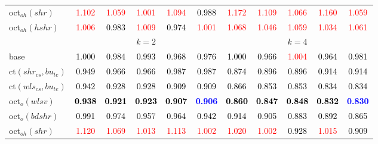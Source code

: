 \begin{tabular}[t]{l|>{}cccc>{}c|ccccc}
oct$_{oh}(shr)$ & \textcolor{red}{1.102} & \textcolor{red}{1.059} & \textcolor{red}{1.001} & \textcolor{red}{1.094} & \textcolor{black}{0.988} & \textcolor{red}{1.172} & \textcolor{red}{1.109} & \textcolor{red}{1.066} & \textcolor{red}{1.160} & \textcolor{red}{1.059}\\
oct$_{oh}(hshr)$ & \textcolor{red}{1.006} & \textcolor{black}{0.983} & \textcolor{red}{1.009} & \textcolor{black}{0.974} & \textcolor{red}{1.001} & \textcolor{red}{1.068} & \textcolor{red}{1.046} & \textcolor{red}{1.059} & \textcolor{red}{1.034} & \textcolor{red}{1.061}\\
\addlinespace[0.3em]
\multicolumn{1}{c}{} & \multicolumn{5}{c}{\textbf{$k = 2$}} & \multicolumn{5}{c}{\textbf{$k = 4$}}\\
base & \textcolor{black}{1.000} & \textcolor{black}{0.984} & \textcolor{black}{0.993} & \textcolor{black}{0.968} & \textcolor{black}{0.976} & \textcolor{black}{1.000} & \textcolor{black}{0.966} & \textcolor{red}{1.004} & \textcolor{black}{0.964} & \textcolor{black}{0.981}\\
ct$(shr_{cs}, bu_{te})$ & \textcolor{black}{0.949} & \textcolor{black}{0.966} & \textcolor{black}{0.966} & \textcolor{black}{0.987} & \textcolor{black}{0.987} & \textcolor{black}{0.874} & \textcolor{black}{0.896} & \textcolor{black}{0.896} & \textcolor{black}{0.914} & \textcolor{black}{0.914}\\
ct$(wls_{cs}, bu_{te})$ & \textcolor{black}{0.942} & \textcolor{black}{0.928} & \textcolor{black}{0.928} & \textcolor{black}{0.909} & \textcolor{black}{0.909} & \textcolor{black}{0.866} & \textcolor{black}{0.853} & \textcolor{black}{0.853} & \textcolor{black}{0.834} & \textcolor{black}{0.834}\\
oct$_o(wlsv)$ & \textcolor{black}{\textbf{0.938}} & \textcolor{black}{\textbf{0.921}} & \textcolor{black}{\textbf{0.923}} & \textcolor{black}{\textbf{0.907}} & \textcolor{blue}{\textbf{0.906}} & \textcolor{black}{\textbf{0.860}} & \textcolor{black}{\textbf{0.847}} & \textcolor{black}{\textbf{0.848}} & \textcolor{black}{\textbf{0.832}} & \textcolor{blue}{\textbf{0.830}}\\
oct$_o(bdshr)$ & \textcolor{black}{0.991} & \textcolor{black}{0.974} & \textcolor{black}{0.957} & \textcolor{black}{0.964} & \textcolor{black}{0.942} & \textcolor{black}{0.914} & \textcolor{black}{0.905} & \textcolor{black}{0.883} & \textcolor{black}{0.892} & \textcolor{black}{0.865}\\
oct$_{oh}(shr)$ & \textcolor{red}{1.120} & \textcolor{red}{1.069} & \textcolor{red}{1.013} & \textcolor{red}{1.113} & \textcolor{red}{1.002} & \textcolor{red}{1.020} & \textcolor{red}{1.002} & \textcolor{black}{0.928} & \textcolor{red}{1.015} & \textcolor{black}{0.909}\\

\end{tabular}
